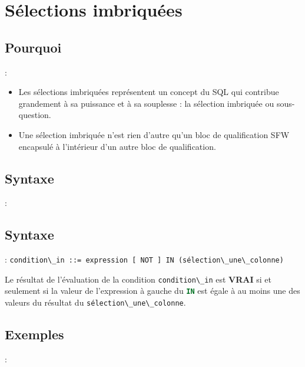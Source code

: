 \documentclass[10pt]{beamer}
\begin{document}
\section{Sélections imbriquées}
\subsection{Pourquoi}
\begin{frame}{\secname : \subsecname}
    \begin{itemize}
        \item Les sélections imbriquées représentent un concept du SQL qui contribue grandement à sa puissance et à sa souplesse : la sélection imbriquée ou sous-question.
        \item Une sélection imbriquée n'est rien d'autre qu'un bloc de qualification SFW encapsulé à l'intérieur d'un autre bloc de qualification.
    \end{itemize}
\end{frame}

\subsection{Syntaxe}
\begin{frame}{\secname : \subsecname}
    
\end{frame}

\subsection{Syntaxe}
\begin{frame}{\secname : \subsecname}
    \lstinline[language=bnf]!condition\_in ::= expression [ NOT ] IN (sélection\_une\_colonne)!
    \newline

    Le résultat de l'évaluation de la condition \lstinline[language=bnf]!condition\_in! est \textbf{VRAI} si et seulement si la valeur de l'expression à gauche du \lstinline[language=sql]!IN! est égale à au moins une des valeurs du résultat du \lstinline[language=bnf]!sélection\_une\_colonne!.
\end{frame}

\subsection{Exemples}
\begin{frame}{\secname : \subsecname}
    
\end{frame}
\end{document}

